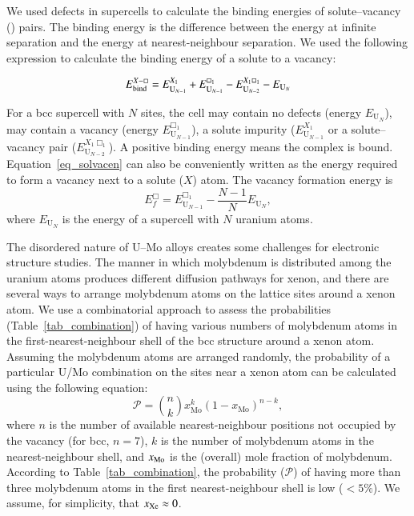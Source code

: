 We used defects in supercells to calculate the binding energies
of solute--vacancy () pairs. The binding energy is the
difference between the energy at infinite separation and the energy at
nearest-neighbour separation. We used the following expression to calculate the
binding energy of a solute to a vacancy:

\begin{equation}
  E_\text{bind}^{\ce{$X$-\Box}}
    = E^{X_1}_{\mathrm{U}_{N-1}} + E^{\Box_1}_{\mathrm{U}_{N-1}}
    - E^{X_1\Box_1}_{\mathrm{U}_{N-2}} - E_{\mathrm{U}_N}
  \label{eq_solvacen}
\end{equation}

For a bcc supercell with $N$ sites, the cell may contain no defects (energy
$E_{\mathrm{U}_N}$), may contain a vacancy (energy $E^{\Box_1}_{\mathrm{U}_{N-1}}$), a solute
impurity ($E^{X_1}_{\mathrm{U}_{N-1}}$ or a solute--vacancy pair
($E^{X_1\Box_1}_{\mathrm{U}_{N-2}}$).
A positive binding energy means the complex is bound.
Equation~\eqref{eq_solvacen} can
also be conveniently written as the energy required to form a vacancy next to
a solute ($X$) atom. The vacancy formation energy is 
\begin{equation}
    E^{\Box}_f = E^{\Box_1}_{\mathrm{U}_{N-1}}
        - \frac{N-1}{N} E_{\mathrm{U}_N},
  \label{eq_vacen}
\end{equation}
where $E_{\mathrm{U}_N}$ is the energy of a supercell with $N$ uranium atoms.

The disordered nature of U--Mo alloys creates some challenges for electronic
structure studies. The manner in which molybdenum is distributed among the
uranium atoms produces different diffusion pathways
for xenon, and there are several ways to arrange molybdenum atoms on the
lattice sites around a xenon atom. We use a combinatorial approach to assess
the probabilities (Table~\ref{tab_combination}) of having various numbers of
molybdenum atoms in the first-nearest-neighbour shell of the bcc structure
around a xenon atom. Assuming the molybdenum atoms are arranged randomly, the
probability of a particular U/Mo combination on the sites near a xenon
atom can be calculated using the following equation:
\begin{equation}\label{eq_combination}
  \mathcal{P} = \binom{n}{k} x^k_\text{Mo} ( 1 - x_\text{Mo})^{n-k},
\end{equation}
where $n$ is the number of available nearest-neighbour positions not occupied
by the vacancy (for bcc, $n=7$), $k$ is the number of molybdenum atoms in
the nearest-neighbour shell, and $x_{\ce{Mo}}$ is the (overall) mole fraction
of molybdenum. According to Table~\ref{tab_combination},
the probability ($\mathcal{P}$) of having more than three molybdenum atoms in
the first nearest-neighbour shell is low ($< 5\%$).
We assume, for simplicity, that $x_{\ce{Xe}} \approx 0$.

